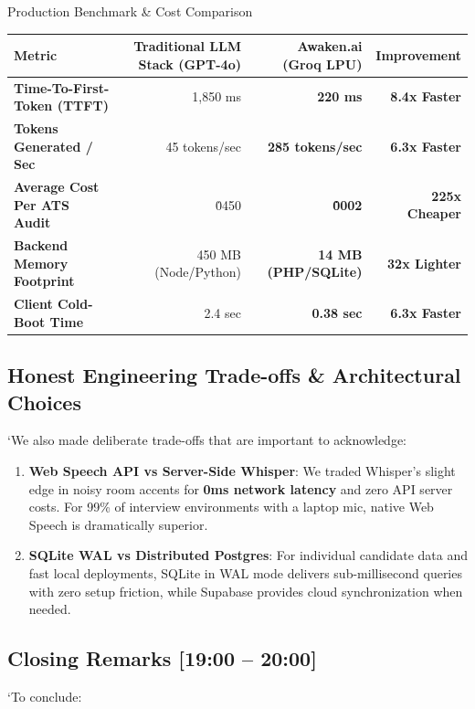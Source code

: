 \documentclass[11pt,a4paper]{article}
\begin{document}
\begin{techbox}{Production Benchmark \& Cost Comparison}
\begin{tabularx}{\textwidth}{l r r r}
\toprule
\textbf{Metric} & \textbf{Traditional LLM Stack (GPT-4o)} & \textbf{Awaken.ai (Groq LPU)} & \textbf{Improvement} \\
\midrule
\textbf{Time-To-First-Token (TTFT)} & 1,850 ms & \textbf{220 ms} & \textcolor{highlightblue}{\textbf{8.4x Faster}} \\
\textbf{Tokens Generated / Sec} & 45 tokens/sec & \textbf{285 tokens/sec} & \textcolor{highlightblue}{\textbf{6.3x Faster}} \\
\textbf{Average Cost Per ATS Audit} & \.0450 & \textbf{\.0002} & \textcolor{highlightblue}{\textbf{225x Cheaper}} \\
\textbf{Backend Memory Footprint} & 450 MB (Node/Python) & \textbf{14 MB (PHP/SQLite)} & \textcolor{highlightblue}{\textbf{32x Lighter}} \\
\textbf{Client Cold-Boot Time} & 2.4 sec & \textbf{0.38 sec} & \textcolor{highlightblue}{\textbf{6.3x Faster}} \\
\bottomrule
\end{tabularx}
\end{techbox}

\subsection{Honest Engineering Trade-offs \& Architectural Choices}
`We also made deliberate trade-offs that are important to acknowledge:
\begin{enumerate}[leftmargin=*]
    \item \textbf{Web Speech API vs Server-Side Whisper}: We traded Whisper's slight edge in noisy room accents for \textbf{0ms network latency} and zero API server costs. For 99\% of interview environments with a laptop mic, native Web Speech is dramatically superior.
    \item \textbf{SQLite WAL vs Distributed Postgres}: For individual candidate data and fast local deployments, SQLite in WAL mode delivers sub-millisecond queries with zero setup friction, while Supabase provides cloud synchronization when needed.
\end{enumerate}

\subsection{Closing Remarks [19:00 -- 20:00]}
`To conclude:
\end{document}
